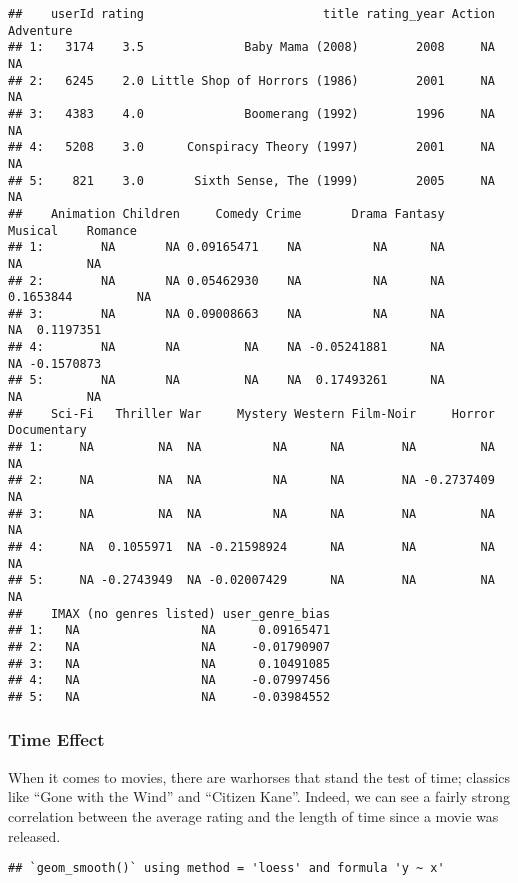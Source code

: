 \documentclass[
]{article}
\begin{document}
\begin{verbatim}
##    userId rating                         title rating_year Action Adventure
## 1:   3174    3.5              Baby Mama (2008)        2008     NA        NA
## 2:   6245    2.0 Little Shop of Horrors (1986)        2001     NA        NA
## 3:   4383    4.0              Boomerang (1992)        1996     NA        NA
## 4:   5208    3.0      Conspiracy Theory (1997)        2001     NA        NA
## 5:    821    3.0       Sixth Sense, The (1999)        2005     NA        NA
##    Animation Children     Comedy Crime       Drama Fantasy   Musical    Romance
## 1:        NA       NA 0.09165471    NA          NA      NA        NA         NA
## 2:        NA       NA 0.05462930    NA          NA      NA 0.1653844         NA
## 3:        NA       NA 0.09008663    NA          NA      NA        NA  0.1197351
## 4:        NA       NA         NA    NA -0.05241881      NA        NA -0.1570873
## 5:        NA       NA         NA    NA  0.17493261      NA        NA         NA
##    Sci-Fi   Thriller War     Mystery Western Film-Noir     Horror Documentary
## 1:     NA         NA  NA          NA      NA        NA         NA          NA
## 2:     NA         NA  NA          NA      NA        NA -0.2737409          NA
## 3:     NA         NA  NA          NA      NA        NA         NA          NA
## 4:     NA  0.1055971  NA -0.21598924      NA        NA         NA          NA
## 5:     NA -0.2743949  NA -0.02007429      NA        NA         NA          NA
##    IMAX (no genres listed) user_genre_bias
## 1:   NA                 NA      0.09165471
## 2:   NA                 NA     -0.01790907
## 3:   NA                 NA      0.10491085
## 4:   NA                 NA     -0.07997456
## 5:   NA                 NA     -0.03984552
\end{verbatim}

\hypertarget{time-effect}{%
\subsubsection{Time Effect}\label{time-effect}}

When it comes to movies, there are warhorses that stand the test of
time; classics like ``Gone with the Wind'' and ``Citizen Kane''. Indeed,
we can see a fairly strong correlation between the average rating and
the length of time since a movie was released.

\begin{verbatim}
## `geom_smooth()` using method = 'loess' and formula 'y ~ x'
\end{verbatim}
\end{document}
